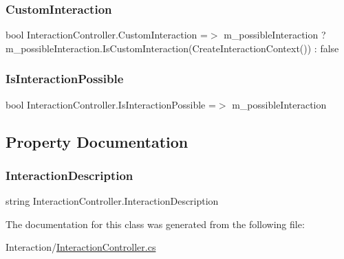 \subsubsection{\texorpdfstring{Custom\+Interaction}{CustomInteraction}}
{\footnotesize\ttfamily bool Interaction\+Controller.\+Custom\+Interaction =$>$ m\+\_\+possible\+Interaction ? m\+\_\+possible\+Interaction.\+Is\+Custom\+Interaction(Create\+Interaction\+Context()) \+: false}

\mbox{\label{class_interaction_controller_ae86bf01b15568b290931636a77726dcf}} 
\subsubsection{\texorpdfstring{Is\+Interaction\+Possible}{IsInteractionPossible}}
{\footnotesize\ttfamily bool Interaction\+Controller.\+Is\+Interaction\+Possible =$>$ m\+\_\+possible\+Interaction}



\subsection{Property Documentation}
\mbox{\label{class_interaction_controller_af63fcbb75235b5e457b44d2e819a6cbd}} 
\subsubsection{\texorpdfstring{Interaction\+Description}{InteractionDescription}}
{\footnotesize\ttfamily string Interaction\+Controller.\+Interaction\+Description\hspace{0.3cm}{\ttfamily [get]}}



The documentation for this class was generated from the following file\+:\begin{DoxyCompactItemize}
\item 
Interaction/\mbox{\hyperlink{_interaction_controller_8cs}{Interaction\+Controller.\+cs}}\end{DoxyCompactItemize}
